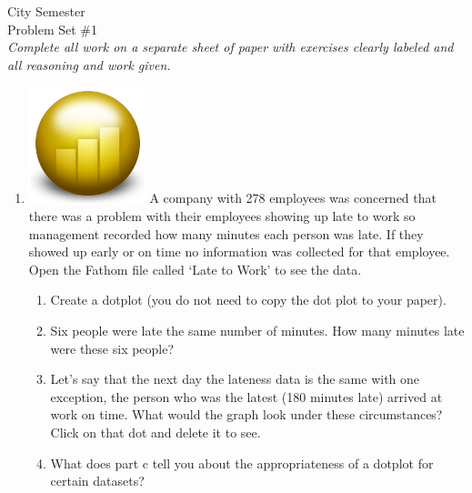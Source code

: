 \documentclass[12pt]{article}
\theoremstyle{plain}     %
\begin{document}
\large
City Semester %
\\
Problem Set \#1\\
\normalsize 
\emph{Complete all work on a separate sheet of paper with exercises clearly labeled and all reasoning and work given.}\\
\begin{enumerate}
	\item \includegraphics[scale=.1]{fathom.png} A company with 278 employees was concerned that there was a problem with their employees showing up late to work so management recorded how many minutes each person was late.  If they showed up early or on time no information was collected for that employee.  Open the Fathom file called `Late to Work' to see the data.
	\begin{enumerate}
		\item Create a dotplot (you do not need to copy 		the dot plot to your paper).
		\item Six people were late the same number of 			minutes. How many minutes late were these six 			people?
		\item Let’s say that the next day the lateness 			data is the same with one exception, the person 		who was the latest (180 minutes late) arrived 			at work on time.  What would the graph look 				under these circumstances? Click on that dot 			and delete it to see.
		\item What does part c tell you about the 				appropriateness of a dotplot for certain datasets?  
	\end{enumerate}
	

\end{enumerate}
\end{document}
